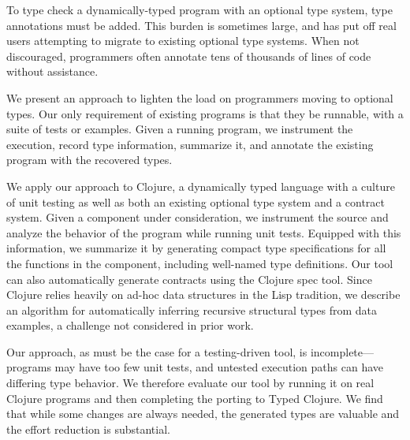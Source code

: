 %


To type check a dynamically-typed program
with an optional type system,
type annotations must be added.
This burden is sometimes large, and has put off real users 
attempting to migrate to
existing optional
type systems. When not discouraged, programmers often
annotate tens of thousands of lines of code without assistance.

We present an approach to lighten the load on programmers moving to
optional types. Our only requirement of existing
programs is that they be runnable, with a suite of tests or
examples. Given a running program, we instrument the execution, record
type information, summarize it, and annotate the existing program with
the recovered types.

We apply our approach to Clojure, a dynamically typed
language with a culture of unit testing as well as both an existing
optional type system and a contract system. Given a component under
consideration, we instrument the source and analyze the behavior of the
program while running unit tests.
Equipped with this information, we summarize it by generating compact
type specifications for all the functions in the component, including
well-named type definitions. Our tool can also automatically generate
contracts using the Clojure spec tool. Since Clojure relies
heavily on ad-hoc data structures in the Lisp tradition, we describe
an algorithm for automatically inferring recursive structural types
from data examples, a challenge not considered in prior work.

Our approach, as must be the case for a testing-driven tool, is
incomplete---programs may have too few unit tests, and untested
execution paths can have differing type behavior. We therefore
evaluate our tool by running it on real Clojure programs and then
completing the porting to Typed Clojure. We find that while
some changes are always needed, the generated types are
valuable and the effort reduction is substantial.

